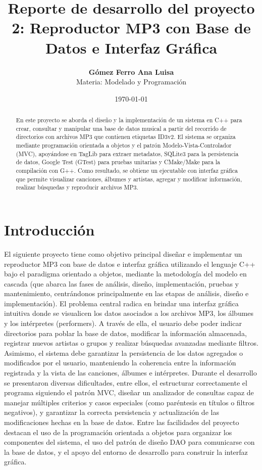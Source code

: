 \documentclass[11pt,a4paper]{article}
\title{\textbf{Reporte de desarrollo del proyecto 2: Reproductor MP3 con Base de Datos e Interfaz Gráfica}}
\author{\textbf{Gómez Ferro Ana Luisa} \\
Materia: Modelado y Programación}
\date{\today}
\begin{document}
\maketitle

\begin{abstract}
En este proyecto se aborda el diseño y la implementación de un sistema en C++ para crear, consultar y manipular una base de datos musical a partir del recorrido de directorios con archivos MP3 que contienen etiquetas ID3v2. El sistema se organiza mediante programación orientada a objetos y el patrón Modelo-Vista-Controlador (MVC), apoyándose en TagLib para extraer metadatos, SQLite3 para la persistencia de datos, Google Test (GTest) para pruebas unitarias y CMake/Make para la compilación con G++. Como resultado, se obtiene un ejecutable con interfaz gráfica que permite visualizar canciones, álbumes y artistas, agregar y modificar información, realizar búsquedas y reproducir archivos MP3.
\end{abstract}

\section{Introducción}
El siguiente proyecto tiene como objetivo principal diseñar e implementar un reproductor MP3 con base de datos e interfaz gráfica utilizando el lenguaje C++ bajo el paradigma orientado a objetos, mediante la metodología del modelo en cascada (que abarca las fases de análisis, diseño, implementación, pruebas y mantenimiento, centrándonos principalmente en las etapas de análisis, diseño e implementación).
El problema central radica en brindar una interfaz gráfica intuitiva donde se visualicen los datos asociados a los archivos MP3, los álbumes y los intérpretes (performers). A través de ella, el usuario debe poder indicar directorios para poblar la base de datos, modificar la información almacenada, registrar nuevos artistas o grupos y realizar búsquedas avanzadas mediante filtros. Asimismo, el sistema debe garantizar la persistencia de los datos agregados o modificados por el usuario, manteniendo la coherencia entre la información registrada y la vista de las canciones, álbumes e intérpretes.
Durante el desarrollo se presentaron diversas dificultades, entre ellos, el estructurar correctamente el programa siguiendo el patrón MVC, diseñar un analizador de consultas capaz de manejar múltiples criterios y casos especiales (como paréntesis en títulos o filtros negativos), y garantizar la correcta persistencia y actualización de las modificaciones hechas en la base de datos.
Entre las facilidades del proyecto destacan el uso de la programación orientada a objetos para organizar los componentes del sistema, el uso del patrón de diseño DAO para comunicarse con la base de datos, y el apoyo del entorno de desarrollo para construir la interfaz gráfica.
\end{document}
